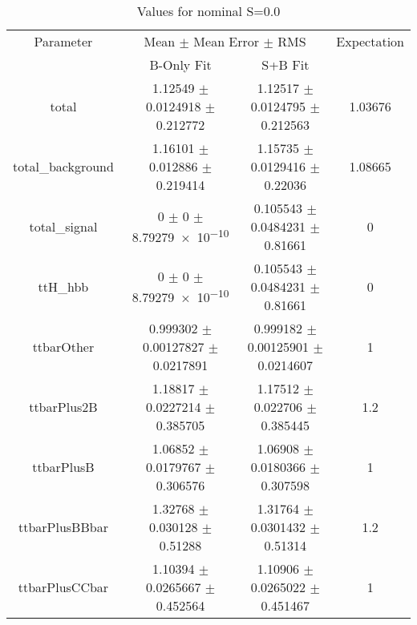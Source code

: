\begin{table}
\centering
\caption{Values for nominal S=0.0}
\begin{tabular}{cccc}
\toprule
Parameter & \multicolumn{2}{c}{Mean $\pm$ Mean Error $\pm$ RMS} & Expectation\\
 & B-Only Fit & S+B Fit & \\
\midrule
total & \num{1.12549} $\pm$ \num{0.0124918} $\pm$ \num{0.212772} & \num{1.12517} $\pm$ \num{0.0124795} $\pm$ \num{0.212563} & \num{1.03676}\\
total\_background & \num{1.16101} $\pm$ \num{0.012886} $\pm$ \num{0.219414} & \num{1.15735} $\pm$ \num{0.0129416} $\pm$ \num{0.22036} & \num{1.08665}\\
total\_signal & \num{0} $\pm$ \num{0} $\pm$ \num{8.79279e-10} & \num{0.105543} $\pm$ \num{0.0484231} $\pm$ \num{0.81661} & \num{0}\\
ttH\_hbb & \num{0} $\pm$ \num{0} $\pm$ \num{8.79279e-10} & \num{0.105543} $\pm$ \num{0.0484231} $\pm$ \num{0.81661} & \num{0}\\
ttbarOther & \num{0.999302} $\pm$ \num{0.00127827} $\pm$ \num{0.0217891} & \num{0.999182} $\pm$ \num{0.00125901} $\pm$ \num{0.0214607} & \num{1}\\
ttbarPlus2B & \num{1.18817} $\pm$ \num{0.0227214} $\pm$ \num{0.385705} & \num{1.17512} $\pm$ \num{0.022706} $\pm$ \num{0.385445} & \num{1.2}\\
ttbarPlusB & \num{1.06852} $\pm$ \num{0.0179767} $\pm$ \num{0.306576} & \num{1.06908} $\pm$ \num{0.0180366} $\pm$ \num{0.307598} & \num{1}\\
ttbarPlusBBbar & \num{1.32768} $\pm$ \num{0.030128} $\pm$ \num{0.51288} & \num{1.31764} $\pm$ \num{0.0301432} $\pm$ \num{0.51314} & \num{1.2}\\
ttbarPlusCCbar & \num{1.10394} $\pm$ \num{0.0265667} $\pm$ \num{0.452564} & \num{1.10906} $\pm$ \num{0.0265022} $\pm$ \num{0.451467} & \num{1}\\
\bottomrule
\end{tabular}
\end{table}